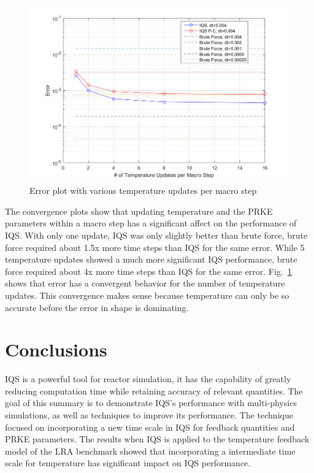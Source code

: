 \documentclass{anstrans}
\newcommand{\fig}[1]{Fig.~\ref{#1}}                      %
\begin{document}
\begin{figure}[htbp!]
\centering
\includegraphics[width=\linewidth]{lra_mp.png}
\caption{Error plot with various temperature updates per macro step}
\label{fig:mp}
\end{figure}

The convergence plots show that updating temperature and the PRKE parameters within a macro step has a significant affect on the performance of IQS.  With only one update, IQS was only slightly better than brute force, brute force required about 1.5x more time steps than IQS for the same error.  While 5 temperature updates showed a much more significant IQS performance, brute force required about 4x more time steps than IQS for the same error.  \fig{fig:mp} shows that error has a convergent behavior for the number of temperature updates.  This convergence makes sense because temperature can only be so accurate before the error in shape is dominating.

\section{Conclusions}

IQS is a powerful tool for reactor simulation, it has the capability of greatly reducing computation time while retaining accuracy of relevant quantities.  The goal of this summary is to demonstrate IQS's performance with multi-physics simulations, as well as techniques to improve its performance.  The technique focused on incorporating a new time scale in IQS for feedback quantities and PRKE parameters.  The results when IQS is applied to the temperature feedback model of the LRA benchmark showed that incorporating a intermediate time scale for temperature has significant impact on IQS performance.
\end{document}
